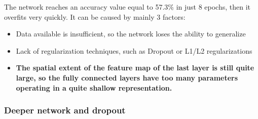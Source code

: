 \medskip

\noindent The network reaches an accuracy value equal to 57.3\% in just 8 epochs, then it overfits very quickly. It can be caused by mainly 3 factors:
\begin{itemize}
\item Data available is insufficient, so the network loses the ability to generalize
\item Lack of regularization techniques, such as Dropout or L1/L2 regularizations
\item \textbf{The spatial extent of the feature map of the last layer is still quite large, so the fully connected layers have too many parameters operating in a quite shallow representation. } 
\end{itemize} 

\subsubsection{Deeper network and dropout}

